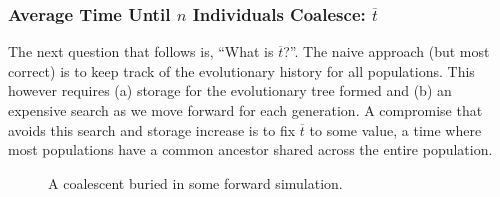\subsubsection{Average Time Until $n$ Individuals Coalesce: $\overbar{t}$}
The next question that follows is, ``What is $\overbar{t}$?''.
The naive approach (but most correct) is to keep track of the evolutionary history for all populations.
This however requires (a) storage for the evolutionary tree formed and (b) an expensive search as we move forward for
each generation.
A compromise that avoids this search and storage increase is to fix $\overbar{t}$ to some value, a time where most
populations have a common ancestor shared across the entire population.

\begin{figure}[t]
    \centering
    \subfloat{{  }}
    \qquad \qquad \qquad
    \subfloat{{  }}
    \caption{A coalescent buried in some forward simulation.}
    \label{fig:coalescentBuried}
\end{figure}

